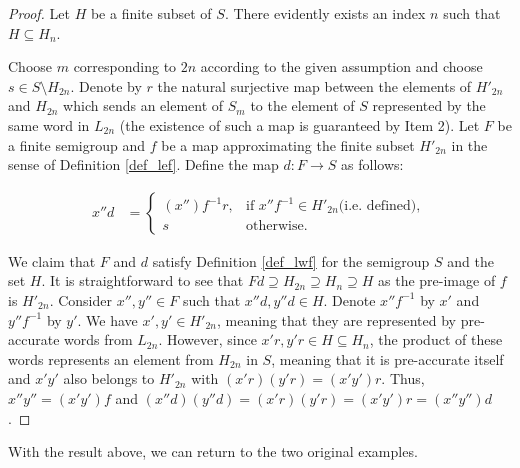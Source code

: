 \documentclass{article}
\theoremstyle{definition}
\begin{document}
\begin{proof}
    Let $H$ be a finite subset of $S$. There evidently exists an index $n$ such that $H \subseteq H_n$.

    Choose $m$ corresponding to $2n$ according to the given assumption and choose $s \in S \setminus H_{2n}$. Denote by $r$ the natural surjective map between the elements of $H'_{2n}$ and $H_{2n}$ which sends an element of $S_m$ to the element of $S$ represented by the same word in $L_{2n}$ (the existence of such a map is guaranteed by Item 2). Let $F$ be a finite semigroup and $f$ be a map approximating the finite subset $H'_{2n}$ in the sense of Definition \ref{def_lef}. Define the map $d: F \rightarrow S$ as follows:

    \begin{align*}
 x'' d & = \begin{cases} (x'') f^{-1} r, & \text{if }x''f^{-1} \in H'_{2n} \text{(i.e. defined)}, \\ s & \text{otherwise}.  \end{cases}
\end{align*}

    We claim that $F$ and $d$ satisfy Definition  \ref{def_lwf} for the semigroup $S$ and the set $H$. It is straightforward to see that $Fd \supseteq H_{2n} \supseteq H_n \supseteq H$ as the pre-image of $f$ is $H'_{2n}$. Consider $x'', y'' \in F$ such that $x'' d, y'' d \in H$. Denote $x'' f^{-1}$ by $x'$ and  $y'' f^{-1}$ by $y'$. We have $x', y' \in H'_{2n}$, meaning that they are represented by pre-accurate words from $L_{2n}$. However, since $x'r, y'r \in H \subseteq H_n$, the product of these words represents an element from $H_{2n}$ in $S$, meaning that it is pre-accurate itself and $x'y'$ also belongs to $H'_{2n}$ with $(x'r) (y'r) = (x'y')r$. Thus, $x'' y'' = (x'y') f$ and $(x'' d) (y''d) = (x' r) (y'r) = (x' y') r = (x'' y'') d $.
\end{proof}

With the result above, we can return to the two original examples.
\end{document}
